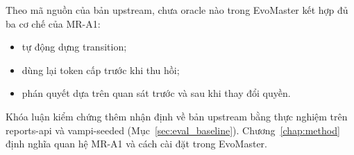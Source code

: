 Theo mã nguồn của bản upstream, chưa oracle nào trong EvoMaster kết hợp đủ ba cơ chế của MR-A1:
\begin{itemize}
    \item tự động dựng transition;
    \item dùng lại token cấp trước khi thu hồi;
    \item phán quyết dựa trên quan sát trước và sau khi thay đổi quyền.
\end{itemize}
Khóa luận kiểm chứng thêm nhận định về bản upstream bằng thực nghiệm trên reports-api và vampi-seeded (Mục~\ref{sec:eval_baseline}). Chương~\ref{chap:method} định nghĩa quan hệ MR-A1 và cách cài đặt trong EvoMaster.
